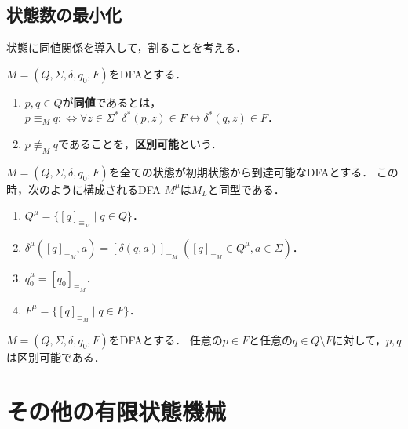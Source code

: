 \documentclass[uplatex, dvipdfmx]{jsreport}
\begin{document}
\subsection{状態数の最小化}

\begin{screen}
    状態に同値関係を導入して，割ることを考える．
\end{screen}

\begin{definition}
    $M=(Q,\Sigma,\delta,q_0,F)$をDFAとする．
    \begin{enumerate}
        \item $p,q\in Q$が\textbf{同値}であるとは，$p\equiv_Mq:\Leftrightarrow \forall z\in\Sigma^*\;\delta^*(p,z)\in F\leftrightarrow \delta^*(q,z)\in F$．
        \item $p\not\equiv_Mq$であることを，\textbf{区別可能}という．
    \end{enumerate}
\end{definition}

\begin{theorem}
    $M=(Q,\Sigma,\delta,q_0,F)$を全ての状態が初期状態から到達可能なDFAとする．
    この時，次のように構成されるDFA $M^\mu$は$M_L$と同型である．
    \begin{enumerate}
        \item $Q^\mu=\{[q]_{\equiv_M}\mid q\in Q\}$．
        \item $\delta^\mu([q]_{\equiv_M},a)=[\delta(q,a)]_{\equiv_M}\;([q]_{\equiv_M}\in Q^\mu,a\in\Sigma)$．
        \item $q_0^\mu=[q_0]_{\equiv_M}$．
        \item $F^\mu=\{[q]_{\equiv_M}\mid q\in F\}$．
    \end{enumerate}
\end{theorem}

\begin{proposition}
    $M=(Q,\Sigma,\delta,q_0,F)$をDFAとする．
    任意の$p\in F$と任意の$q\in Q\setminus F$に対して，$p,q$は区別可能である．
\end{proposition}

\section{その他の有限状態機械}\label{sec-transducer}
\end{document}
